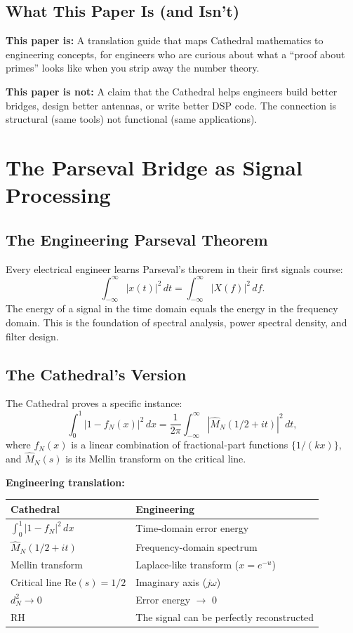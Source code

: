 \documentclass[11pt,a4paper]{article}
\begin{document}
\subsection{What This Paper Is (and Isn't)}

\textbf{This paper is:} A translation guide that maps Cathedral
mathematics to engineering concepts, for engineers who are curious
about what a ``proof about primes'' looks like when you strip away
the number theory.

\textbf{This paper is not:} A claim that the Cathedral helps
engineers build better bridges, design better antennas, or write
better DSP code. The connection is structural (same tools) not
functional (same applications).

\section{The Parseval Bridge as Signal Processing}
\label{sec:signal}

\subsection{The Engineering Parseval Theorem}

Every electrical engineer learns Parseval's theorem in their first
signals course:
\[
  \int_{-\infty}^{\infty} |x(t)|^2\,dt =
  \int_{-\infty}^{\infty} |X(f)|^2\,df.
\]
The energy of a signal in the time domain equals the energy in the
frequency domain. This is the foundation of spectral analysis,
power spectral density, and filter design.

\subsection{The Cathedral's Version}

The Cathedral proves a specific instance:
\[
  \int_0^1 |1 - f_N(x)|^2\,dx =
  \frac{1}{2\pi} \int_{-\infty}^{\infty}
  |\hat{M}_N(1/2 + it)|^2\,dt,
\]
where $f_N(x)$ is a linear combination of fractional-part functions
$\{1/(kx)\}$, and $\hat{M}_N(s)$ is its Mellin transform on the
critical line.

\textbf{Engineering translation:}
\begin{center}
\begin{tabular}{@{}ll@{}}
\toprule
\textbf{Cathedral} & \textbf{Engineering} \\
\midrule
$\int_0^1 |1-f_N|^2\,dx$ & Time-domain error energy \\
$\hat{M}_N(1/2+it)$ & Frequency-domain spectrum \\
Mellin transform & Laplace-like transform ($x = e^{-u}$) \\
Critical line $\mathrm{Re}(s) = 1/2$ & Imaginary axis ($j\omega$) \\
$d_N^2 \to 0$ & Error energy $\to$ 0 \\
RH & The signal can be perfectly reconstructed \\
\bottomrule
\end{tabular}
\end{center}
\end{document}

